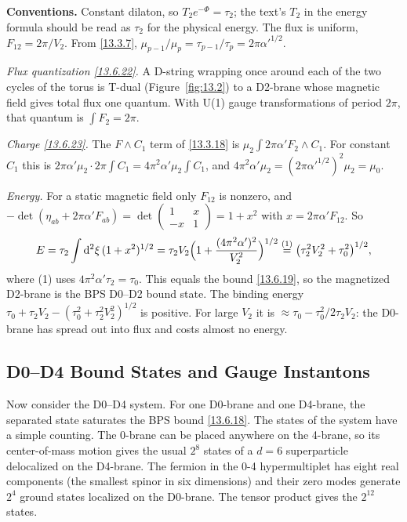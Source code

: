 \begin{tcolorbox}[breakable]
	\begin{remark}
		\textbf{Conventions.} Constant dilaton, so $T_2e^{-\Phi}=\tau_2$; the text's $T_2$ in the energy formula should be read as $\tau_2$ for the physical energy. The flux is uniform, $F_{12}=2\pi/V_2$. From \eqref{13.3.7}, $\mu_{p-1}/\mu_p=\tau_{p-1}/\tau_p=2\pi\alpha'^{1/2}$.

		\textit{Flux quantization \eqref{13.6.22}.} A D-string wrapping once around each of the two cycles of the torus is T-dual (Figure~\ref{fig:13.2}) to a D2-brane whose magnetic field gives total flux one quantum. With U(1) gauge transformations of period $2\pi$, that quantum is $\int F_2=2\pi$.

		\textit{Charge \eqref{13.6.23}.} The $F\wedge C_1$ term of \eqref{13.3.18} is $\mu_2\int2\pi\alpha'F_2\wedge C_1$. For constant $C_1$ this is $2\pi\alpha'\mu_2\cdot2\pi\int C_1=4\pi^2\alpha'\mu_2\int C_1$, and $4\pi^2\alpha'\mu_2=(2\pi\alpha'^{1/2})^2\mu_2=\mu_0$.

		\textit{Energy.} For a static magnetic field only $F_{12}$ is nonzero, and $-\det(\eta_{ab}+2\pi\alpha'F_{ab})=\det\begin{pmatrix}1&x\\-x&1\end{pmatrix}=1+x^2$ with $x=2\pi\alpha'F_{12}$. So
		\begin{align*}
			E = \tau_2\int\mathrm{d}^2\xi\,(1+x^2)^{1/2} = \tau_2V_2\Bigl(1+\frac{(4\pi^2\alpha')^2}{V_2^2}\Bigr)^{1/2} \overset{(1)}{=} \bigl(\tau_2^2V_2^2+\tau_0^2\bigr)^{1/2},
		\end{align*}
		where (1) uses $4\pi^2\alpha'\tau_2=\tau_0$. This equals the bound \eqref{13.6.19}, so the magnetized D2-brane is the BPS D0--D2 bound state. The binding energy $\tau_0+\tau_2V_2-(\tau_0^2+\tau_2^2V_2^2)^{1/2}$ is positive. For large $V_2$ it is $\approx\tau_0-\tau_0^2/2\tau_2V_2$: the D0-brane has spread out into flux and costs almost no energy.
	\end{remark}
\end{tcolorbox}

\subsection*{D0--D4 Bound States and Gauge Instantons}

Now consider the D0--D4 system. For one D0-brane and one D4-brane, the separated state saturates the BPS bound \eqref{13.6.18}. The states of the system have a simple counting. The 0-brane can be placed anywhere on the 4-brane, so its center-of-mass motion gives the usual $2^8$ states of a $d = 6$ superparticle delocalized on the D4-brane. The fermion in the 0-4 hypermultiplet has eight real components (the smallest spinor in six dimensions) and their zero modes generate $2^4$ ground states localized on the D0-brane. The tensor product gives the $2^{12}$ states.

